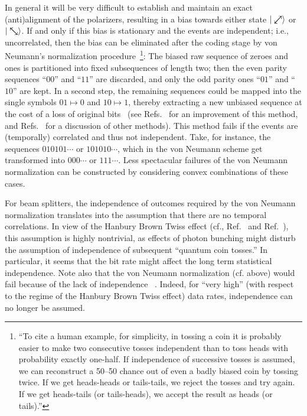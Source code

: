 \documentclass[%
 preprint,
 showpacs,
 showkeys,
 preprintnumbers,
 amsmath,amssymb,
 aps,
 prl,
  longbibliography,
 ]{revtex4-1}
\begin{document}
In general it will be very difficult to establish and maintain an exact (anti)alignment of the polarizers,
resulting in a bias towards either state
$\vert \swarrow\mkern-18mu\nearrow \rangle $ or
$\vert \searrow\mkern-18mu\nwarrow  \rangle $.
If and only if this bias is stationary and the events are independent; i.e., uncorrelated,
then the bias can be eliminated after the coding stage
by von Neumann's normalization procedure~\footnote{
``To cite a human example, for simplicity, in tossing a coin it is probably easier to make two consecutive tosses independent than to toss heads with probability exactly one-half.
If independence of successive tosses is assumed, we can reconstruct a 50--50 chance out of even a badly biased coin by tossing twice.
If we get heads-heads or tails-tails, we reject the tosses and try again. If we get heads-tails (or tails-heads),
we accept the result as heads (or tails).''}:
The biased raw sequence of zeroes and ones is partitioned into
fixed subsequences of length two; then the even parity sequences ``$00$'' and ``$11$'' are discarded,
and only the odd parity ones ``$01$'' and ``$10$'' are kept.
In a second step, the remaining sequences could be mapped into the single symbols $01 \mapsto 0$ and  $10 \mapsto 1$,
thereby extracting a new unbiased sequence at the cost of a loss of original bits~\cite[p. 768]{von-neumann1}
(see Refs.~\cite{elias-72,PeresY-1992} for an improvement of this method,
and Refs.~\cite{stipcevic4442,dichtl-2007,Lacharme-2008} for a discussion of other methods).
This method fails if the events are (temporally) correlated and thus not independent. Take, for instance,
the sequences $010101 \cdots $ or $101010 \cdots $, which in the von Neumann scheme get transformed into $000\cdots$ or  $111\cdots$.
Less spectacular failures of the von Neumann normalization can be constructed by considering convex combinations of these cases.

For beam splitters, the independence of outcomes required by the von Neumann normalization translates into
the assumption that there are no temporal correlations.
In view of the Hanbury Brown Twiss effect (cf., Ref.~\cite[p.313]{chau} and Ref.~\cite[p.127 ff]{knight-qo}),
this assumption is highly nontrivial, as effects of photon bunching might disturb the assumption of independence of subsequent ``quantum coin tosses.''
In particular, it seems that the bit rate might affect the long term statistical independence.
Note also that the von Neumann normalization (cf. above) would fail because of the lack of independence~\cite[p. 768]{von-neumann1} .
Indeed, for ``very high'' (with respect to the regime of the Hanbury Brown Twiss effect) data rates, independence can no longer be assumed.
\end{document}
